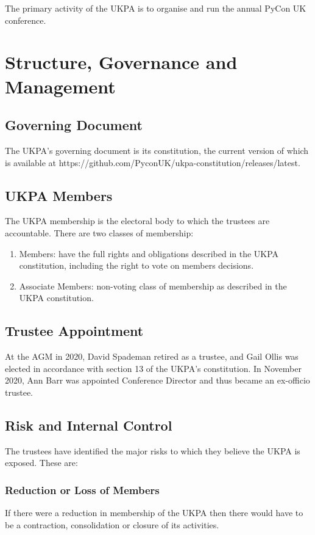 \documentclass[11pt, final]{article}
\begin{document}
    The primary activity of the UKPA is to organise and run the annual PyCon UK conference.

    \section{Structure, Governance and Management}

        \subsection{Governing Document}
        The UKPA's governing document is its constitution, the current version of which is available at https://github.com/PyconUK/ukpa-constitution/releases/latest.

        \subsection{UKPA Members}
        The UKPA membership is the electoral body to which the trustees are accountable.
		There are two classes of membership:

		\begin{enumerate}
			\item Members: have the full rights and obligations described in the UKPA constitution, including the right to vote on members decisions.
			\item Associate Members: non-voting class of membership as described in the UKPA constitution.
		\end{enumerate}

        \subsection{Trustee Appointment}
		At the AGM in 2020, David Spademan retired as a trustee, and  Gail Ollis was elected in accordance with section 13 of the UKPA's constitution.
		In November 2020, Ann Barr was appointed Conference Director and thus became an ex-officio trustee.

	    \subsection{Risk and Internal Control}
        The trustees have identified the major risks to which they believe the UKPA is exposed. These are:

          \subsubsection{Reduction or Loss of Members}
            If there were a reduction in membership of the UKPA then there would have to be a contraction, consolidation or closure of its activities.
\end{document}
